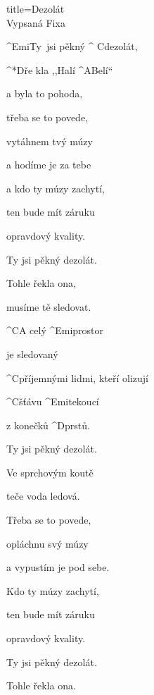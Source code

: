 \begin{song}{title=\predtitle\centering Dezolát\\\large Vypsaná Fixa \vspace*{-0.3cm}}  %
\begin{centerjustified}
\nejvetsi

\begin{varwidth}[t]{0.48\textwidth}\setlength{\parindent}{0.45cm}  %

\sloka
	^{Emi\z}Ty~jsi pěkný ^{\,\,C}dezolát,
	
	^*{D}ře kla ,,Halí ^{A}Belí``
	
	a byla to pohoda,
	
	třeba se to povede,
	
	vytáhnem tvý múzy
	
	a hodíme je za tebe
	
	a kdo ty múzy zachytí,

	ten bude mít záruku
	
	opravdový kvality.
	
	Ty jsi pěkný dezolát.
	
	Tohle řekla ona,
	
	musíme tě sledovat.
	
	^{C}A celý ^{Emi}prostor
	
	je sledovaný
	
	^{C}příjemnými lidmi, kteří olizují
	
	^{C}šťávu ^{Emi}tekoucí
	
	z konečků ^{D}prstů.
	
\sloka
	Ty jsi pěkný dezolát.
	
	Ve sprchovým koutě
	
	teče voda ledová.
	
	Třeba se to povede,
	
	opláchnu svý múzy
	
	a vypustím je pod sebe.
	
	Kdo ty múzy zachytí,
	
	ten bude mít záruku
	
	opravdový kvality.
	
	Ty jsi pěkný dezolát.
	
	Tohle řekla ona.
	
	
\end{varwidth}\mezisloupci\begin{varwidth}[t]{0.48\textwidth}\setlength{\parindent}{0.45cm}%


\end{varwidth}
\end{centerjustified}
\end{song}
